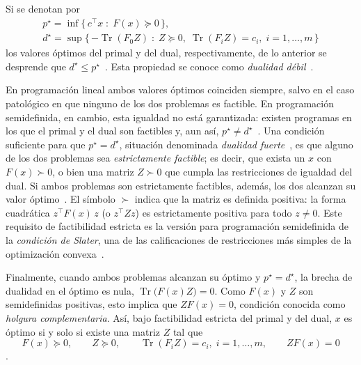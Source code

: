 Si se denotan por
\begin{gather*}
    p^\star = \inf\bigl\{\, c^\top x \;:\; F(x) \succeq 0 \,\bigr\}, \\
    d^\star = \sup\bigl\{\, {-\operatorname{Tr}(F_0 Z)} \;:\; Z \succeq 0,\;
    \operatorname{Tr}(F_i Z) = c_i,\; i = 1, \ldots, m \,\bigr\}
\end{gather*}
los valores óptimos del primal y del dual, respectivamente, de lo anterior se desprende que
$d^\star \leq p^\star$~\parencite[p.~64]{vandenbergheSemidefiniteProgramming1996}. Esta
propiedad se conoce como \textit{dualidad débil}~\parencite[p.~225]{boydConvexOptimization2004}.

En programación lineal ambos valores óptimos coinciden siempre, salvo en el caso patológico en
que ninguno de los dos problemas es factible. En programación semidefinida, en cambio, esta
igualdad no está garantizada: existen programas en los que el primal y el dual son factibles y,
aun así, $p^\star \neq d^\star$~\parencite[pp.~64--65]{vandenbergheSemidefiniteProgramming1996}.
Una condición suficiente para que $p^\star = d^\star$, situación denominada \textit{dualidad
fuerte}~\parencite[p.~226]{boydConvexOptimization2004}, es que alguno de los dos problemas sea
\textit{estrictamente factible}; es decir, que exista un $x$ con $F(x) \succ 0$, o bien una
matriz $Z \succ 0$ que cumpla las restricciones de igualdad del dual. Si ambos problemas son
estrictamente factibles, además, los dos alcanzan su valor
óptimo~\parencite[pp.~64--65]{vandenbergheSemidefiniteProgramming1996}. El símbolo $\succ$
indica que la matriz es definida positiva: la forma cuadrática $z^\top F(x)\, z$ (o
$z^\top Z z$) es estrictamente positiva para todo $z \neq 0$. Este requisito de factibilidad estricta es la
versión para programación semidefinida de la \textit{condición de Slater}, una de las
calificaciones de restricciones más simples de la optimización
convexa~\parencite[pp.~226 y 265--266]{boydConvexOptimization2004}.

Finalmente, cuando ambos problemas alcanzan su óptimo y $p^\star = d^\star$, la brecha de
dualidad en el óptimo es nula, $\operatorname{Tr}\bigl(F(x) Z\bigr) = 0$. Como $F(x)$ y $Z$ son
semidefinidas positivas, esto implica que $Z F(x) = 0$, condición conocida como \textit{holgura
complementaria}. Así, bajo factibilidad estricta del primal y del dual, $x$ es óptimo si y solo
si existe una matriz $Z$ tal que
\begin{equation}
    \label{eq:sdp_optimalidad}
    F(x) \succeq 0, \qquad
    Z \succeq 0, \qquad
    \operatorname{Tr}(F_i Z) = c_i,\; i = 1, \ldots, m, \qquad
    Z F(x) = 0
\end{equation}
\parencite[p.~65]{vandenbergheSemidefiniteProgramming1996}.


